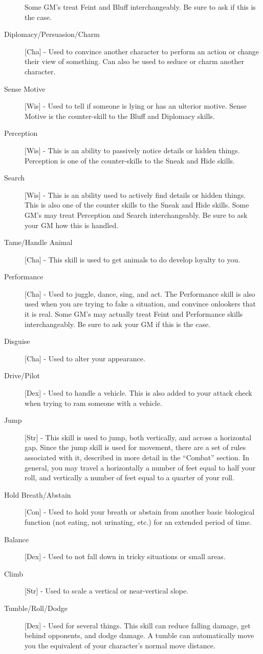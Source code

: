 \begin{description}
Some GM’s treat Feint and Bluff interchangeably. Be sure to ask if this is the case.
\item[Diplomacy/Persuasion/Charm] [Cha] - Used to convince another character to perform an action or change their view of something. Can also be used to seduce or charm another character.
\item[Sense Motive] [Wis] - Used to tell if someone is lying or has an ulterior motive. Sense Motive is the counter-skill to the Bluff and Diplomacy skills.
\item[Perception] [Wis] - This is an ability to passively notice details or hidden things. Perception is one of the counter-skills to the Sneak and Hide skills.
\item[Search] [Wis] - This is an ability used to actively find details or hidden things. This is also one of the counter skills to the Sneak and Hide skills. Some GM’s may treat Perception and Search interchangeably. Be sure to ask your GM how this is handled.
\item[Tame/Handle Animal] [Cha] - This skill is used to get animals to do develop loyalty to you.
\item[Performance] [Cha] - Used to juggle, dance, sing, and act. The Performance skill is also used when you are trying to fake a situation, and convince onlookers that it is real. Some GM’s may actually treat Feint and Performance skills interchangeably. Be sure to ask your GM if this is the case.
\item[Disguise] [Cha] - Used to alter your appearance.
\item[Drive/Pilot] [Dex] - Used to handle a vehicle. This is also added to your attack check when trying to ram someone with a vehicle.
\item[Jump] [Str] - This skill is used to jump, both vertically, and across a horizontal gap. Since the jump skill is used for movement, there are a set of rules associated with it, described in more detail in the “Combat” section. In general, you may travel a horizontally a number of feet equal to half your roll, and vertically a number of feet equal to a quarter of your roll.
\item[Hold Breath/Abstain] [Con] - Used to hold your breath or abstain from another basic biological function (not eating, not urinating, etc.) for an extended period of time.
\item[Balance] [Dex] - Used to not fall down in tricky situations or small areas.
\item[Climb] [Str] - Used to scale a vertical or near-vertical slope.
\item[Tumble/Roll/Dodge] [Dex] - Used for several things. This skill can reduce falling damage, get behind opponents, and dodge damage. A tumble can automatically move you the equivalent of your character’s normal move distance.


\end{description}
